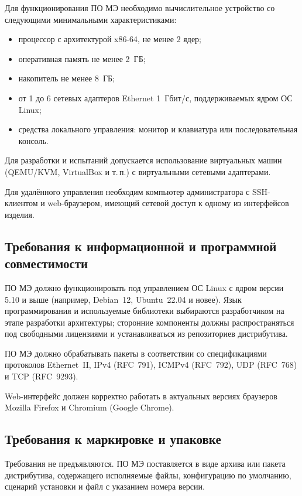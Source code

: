 \documentclass[12pt,a4paper,final]{article}
\begin{document}
Для функционирования ПО МЭ необходимо вычислительное устройство со следующими
минимальными характеристиками:
\begin{itemize}
\item процессор с архитектурой x86-64, не менее 2 ядер;
\item оперативная память не менее 2~ГБ;
\item накопитель не менее 8~ГБ;
\item от 1 до 6 сетевых адаптеров Ethernet 1~Гбит/с, поддерживаемых ядром ОС Linux;
\item средства локального управления: монитор и клавиатура или последовательная консоль.
\end{itemize}

Для разработки и испытаний допускается использование виртуальных машин
(QEMU/KVM, VirtualBox и т.\,п.) с виртуальными сетевыми адаптерами.

Для удалённого управления необходим компьютер администратора с SSH-клиентом
и web-браузером, имеющий сетевой доступ к одному из интерфейсов изделия.

\subsection{Требования к информационной и программной совместимости}

ПО МЭ должно функционировать под управлением ОС Linux с ядром версии 5.10
и выше (например, Debian~12, Ubuntu~22.04 и новее). Язык программирования
и используемые библиотеки выбираются разработчиком на этапе разработки
архитектуры; сторонние компоненты должны распространяться под свободными
лицензиями и устанавливаться из репозиториев дистрибутива.

ПО МЭ должно обрабатывать пакеты в соответствии со спецификациями протоколов
Ethernet~II, IPv4 (RFC~791), ICMPv4 (RFC~792), UDP (RFC~768) и TCP (RFC~9293).

Web-интерфейс должен корректно работать в актуальных версиях браузеров
Mozilla Firefox и Chromium (Google Chrome).

\subsection{Требования к маркировке и упаковке}

Требования не предъявляются. ПО МЭ поставляется в виде архива или пакета
дистрибутива, содержащего исполняемые файлы, конфигурацию по умолчанию,
сценарий установки и файл с указанием номера версии.
\end{document}
